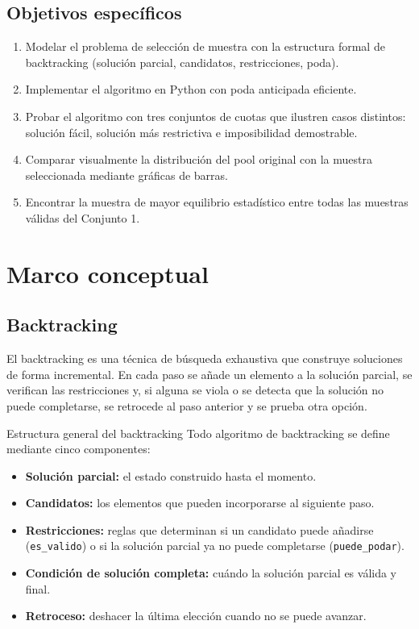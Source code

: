 \documentclass[12pt, a4paper]{article}
\begin{document}
\subsection{Objetivos específicos}

\begin{enumerate}[noitemsep]
  \item Modelar el problema de selección de muestra con la estructura formal de backtracking (solución parcial, candidatos, restricciones, poda).
  \item Implementar el algoritmo en Python con poda anticipada eficiente.
  \item Probar el algoritmo con tres conjuntos de cuotas que ilustren casos distintos: solución fácil, solución más restrictiva e imposibilidad demostrable.
  \item Comparar visualmente la distribución del pool original con la muestra seleccionada mediante gráficas de barras.
  \item Encontrar la muestra de mayor equilibrio estadístico entre todas las muestras válidas del Conjunto 1.
\end{enumerate}

\section{Marco conceptual}

\subsection{Backtracking}

El backtracking es una técnica de búsqueda exhaustiva que construye soluciones de forma incremental. En cada paso se añade un elemento a la solución parcial, se verifican las restricciones y, si alguna se viola o se detecta que la solución no puede completarse, se retrocede al paso anterior y se prueba otra opción.

\begin{definicion}{Estructura general del backtracking}
Todo algoritmo de backtracking se define mediante cinco componentes:
\begin{itemize}[noitemsep]
  \item \textbf{Solución parcial:} el estado construido hasta el momento.
  \item \textbf{Candidatos:} los elementos que pueden incorporarse al siguiente paso.
  \item \textbf{Restricciones:} reglas que determinan si un candidato puede añadirse (\texttt{es\_valido}) o si la solución parcial ya no puede completarse (\texttt{puede\_podar}).
  \item \textbf{Condición de solución completa:} cuándo la solución parcial es válida y final.
  \item \textbf{Retroceso:} deshacer la última elección cuando no se puede avanzar.
\end{itemize}
\end{definicion}
\end{document}

